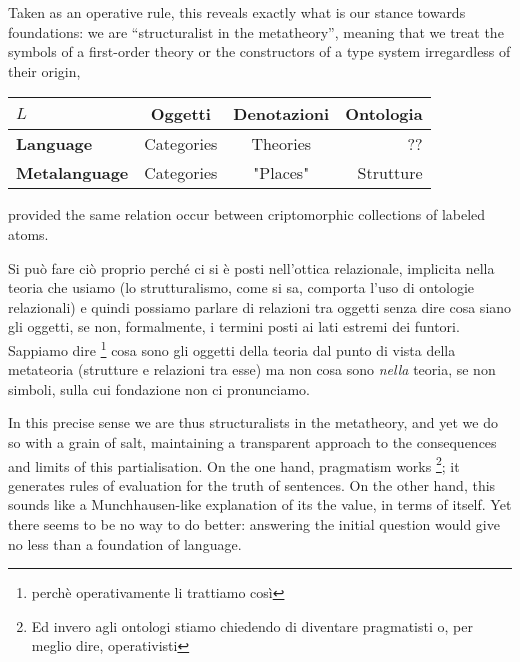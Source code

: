 \documentclass[a4paper, 11pt]{article}
\begin{document}
	Taken as an operative rule, this reveals exactly what is our stance towards foundations: we are ``structuralist in the metatheory'', meaning that we treat the symbols of a first-order theory or the constructors of a type system irregardless of their origin, \endde
	\begin{center}
\begin{tabular}{lccr}\toprule 
	$L$ & Oggetti & Denotazioni & Ontologia \\
	\midrule
	\textbf{Language} & Categories & Theories & ?? \\
	\midrule
	\textbf{Metalanguage} & Categories & "Places" & Strutture 
\end{tabular} 
\end{center}

\endde provided the same relation occur between criptomorphic collections of labeled atoms.

Si può fare ciò proprio perché ci si è posti nell'ottica relazionale, implicita nella teoria che usiamo (lo strutturalismo, come si sa, comporta l'uso di ontologie relazionali) e quindi possiamo parlare di relazioni tra oggetti senza dire cosa siano gli oggetti, se non, formalmente, i termini posti ai lati estremi dei funtori. Sappiamo dire \footnote{perchè operativamente li trattiamo così} cosa sono gli oggetti della teoria dal punto di vista della metateoria (strutture e relazioni tra esse) ma non cosa sono \textit{nella} teoria, se non simboli, sulla cui fondazione non ci pronunciamo. 
	
	In this precise sense we are thus structuralists in the metatheory, and yet we do so with a grain of salt, maintaining a transparent approach to the consequences and limits of this partialisation. On the one hand, pragmatism works \footnote{Ed invero agli ontologi stiamo chiedendo di diventare pragmatisti o, per meglio dire, operativisti}; it generates rules of evaluation for the truth of sentences. On the other hand, this sounds like a Munchhausen-like explanation of its the value, in terms of itself. Yet there seems to be no way to do better: answering the initial question would give no less than a foundation of language.
	
\end{document}
